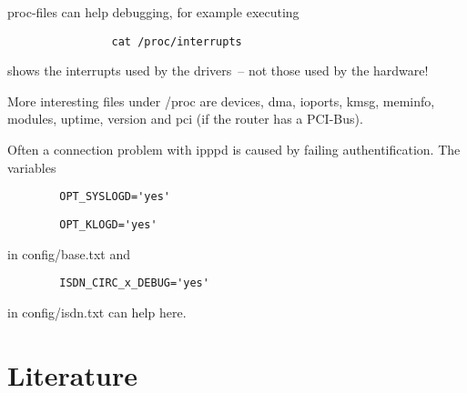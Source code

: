     proc-files can help debugging, for example executing

\begin{example}
\begin{verbatim}
                cat /proc/interrupts
\end{verbatim}
\end{example}
    
    shows the interrupts used by the drivers~-- not those
    used by the hardware!
    
    More interesting files under /proc are devices, dma,
    ioports, kmsg, meminfo, modules, uptime, version and pci (if
    the router has a PCI-Bus).
    
    Often a connection problem with ipppd is caused by 
    failing authentification. The variables

\begin{example}
\begin{verbatim}
        OPT_SYSLOGD='yes'
\end{verbatim}
\end{example}

\begin{example}
\begin{verbatim}
        OPT_KLOGD='yes'
\end{verbatim}
\end{example}

    in config/base.txt and

\begin{example}
\begin{verbatim}
        ISDN_CIRC_x_DEBUG='yes'
\end{verbatim}
\end{example}

    in config/isdn.txt can help here.


    \section{Literature}

